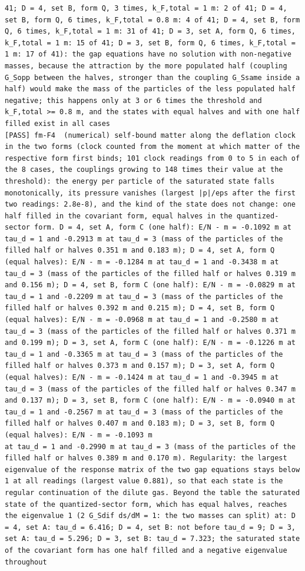 \documentclass[
  10pt,
]{article}
\begin{document}
\begin{verbatim}
41; D = 4, set B, form Q, 3 times, k_F,total = 1 m: 2 of 41; D = 4, set B, form Q, 6 times, k_F,total = 0.8 m: 4 of 41; D = 4, set B, form Q, 6 times, k_F,total = 1 m: 31 of 41; D = 3, set A, form Q, 6 times, k_F,total = 1 m: 15 of 41; D = 3, set B, form Q, 6 times, k_F,total = 1 m: 17 of 41): the gap equations have no solution with non-negative masses, because the attraction by the more populated half (coupling G_Sopp between the halves, stronger than the coupling G_Ssame inside a half) would make the mass of the particles of the less populated half negative; this happens only at 3 or 6 times the threshold and k_F,total >= 0.8 m, and the states with equal halves and with one half filled exist in all cases
[PASS] fm-F4  (numerical) self-bound matter along the deflation clock in the two forms (clock counted from the moment at which matter of the respective form first binds; 101 clock readings from 0 to 5 in each of the 8 cases, the couplings growing to 148 times their value at the threshold): the energy per particle of the saturated state falls monotonically, its pressure vanishes (largest |p|/eps after the first two readings: 2.8e-8), and the kind of the state does not change: one half filled in the covariant form, equal halves in the quantized-sector form. D = 4, set A, form C (one half): E/N - m = -0.1092 m at tau_d = 1 and -0.2913 m at tau_d = 3 (mass of the particles of the filled half or halves 0.351 m and 0.183 m); D = 4, set A, form Q (equal halves): E/N - m = -0.1284 m at tau_d = 1 and -0.3438 m at tau_d = 3 (mass of the particles of the filled half or halves 0.319 m and 0.156 m); D = 4, set B, form C (one half): E/N - m = -0.0829 m at tau_d = 1 and -0.2209 m at tau_d = 3 (mass of the particles of the filled half or halves 0.392 m and 0.215 m); D = 4, set B, form Q (equal halves): E/N - m = -0.0968 m at tau_d = 1 and -0.2580 m at tau_d = 3 (mass of the particles of the filled half or halves 0.371 m and 0.199 m); D = 3, set A, form C (one half): E/N - m = -0.1226 m at tau_d = 1 and -0.3365 m at tau_d = 3 (mass of the particles of the filled half or halves 0.373 m and 0.157 m); D = 3, set A, form Q (equal halves): E/N - m = -0.1424 m at tau_d = 1 and -0.3945 m at tau_d = 3 (mass of the particles of the filled half or halves 0.347 m and 0.137 m); D = 3, set B, form C (one half): E/N - m = -0.0940 m at tau_d = 1 and -0.2567 m at tau_d = 3 (mass of the particles of the filled half or halves 0.407 m and 0.183 m); D = 3, set B, form Q (equal halves): E/N - m = -0.1093 m
at tau_d = 1 and -0.2990 m at tau_d = 3 (mass of the particles of the filled half or halves 0.389 m and 0.170 m). Regularity: the largest eigenvalue of the response matrix of the two gap equations stays below 1 at all readings (largest value 0.881), so that each state is the regular continuation of the dilute gas. Beyond the table the saturated state of the quantized-sector form, which has equal halves, reaches the eigenvalue 1 (2 G_Sdif ds/dM = 1: the two masses can split) at: D = 4, set A: tau_d = 6.416; D = 4, set B: not before tau_d = 9; D = 3, set A: tau_d = 5.296; D = 3, set B: tau_d = 7.323; the saturated state of the covariant form has one half filled and a negative eigenvalue throughout

\end{verbatim}
\end{document}
